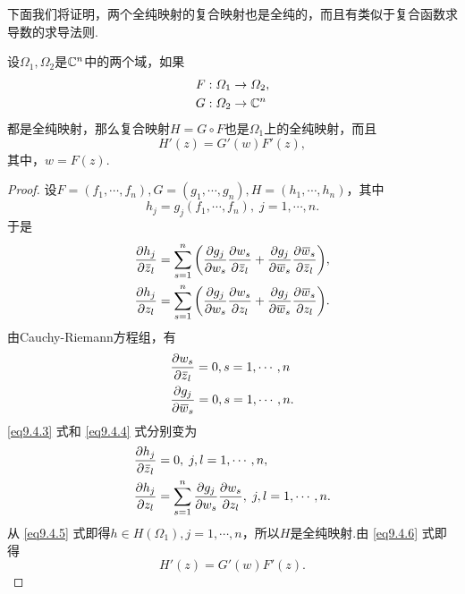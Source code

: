 下面我们将证明，两个全纯映射的复合映射也是全纯的，而且有类似于复合函数求导数的求导法则.
\begin{prop}\label{prop9.4.4}
设$\Omega_1,\Omega_2$是$\MC^n$中的两个域，如果
\begin{align*}
&F:\Omega_1\to\Omega_2,\\
&G:\Omega_2\to\MC^n
\end{align*}
都是全纯映射，那么复合映射$H=G\circ F$也是$\Omega_1$上的全纯映射，而且
\[H'(z)=G'(w)F'(z),\]
其中，$w=F(z)$.
\end{prop}
\begin{proof}
设$F=(f_1,\cdots,f_n),G=(g_1,\cdots,g_n),H=(h_1,\cdots,h_n)$，其中
\[h_j=g_j(f_1,\cdots,f_n),\;j=1,\cdots,n.\]
于是
\begin{align}
&\pp{h_j}{\bar{z}_l}=\sum_{s=1}^n\bigg(\pp{g_j}{w_s}\pp{w_s}{\bar{z}_l}
+\pp{g_j}{\bar{w}_s}\pp{\bar{w}_s}{\bar{z}_l}\bigg),\label{eq9.4.3}\\
&\pp{h_j}{z_l}=\sum_{s=1}^n\bigg(\pp{g_j}{w_s}\pp{w_s}{z_l}
+\pp{g_j}{\bar{w}_s}\pp{\bar{w}_s}{z_l}\bigg).\label{eq9.4.4}
\end{align}
由Cauchy-Riemann方程组，有
\begin{align*}
&\pp{w_s}{\bar{z}_l}=0,s=1,\cdots,n\\
&\pp{g_j}{\bar{w}_s}=0,s=1,\cdots,n.
\end{align*}
\eqref{eq9.4.3} 式和 \eqref{eq9.4.4} 式分别变为
\begin{align}
&\pp{h_j}{\bar{z}_l}=0,\;j,l=1,\cdots,n,\label{eq9.4.5}\\
&\pp{h_j}{z_l}=\sum_{s=1}^n\pp{g_j}{w_s}\pp{w_s}{z_l},\;j,l=1,\cdots,n.\label{eq9.4.6}
\end{align}
从 \eqref{eq9.4.5} 式即得$h\in H(\Omega_1),j=1,\cdots,n$，所以$H$是全纯映射.由 \eqref{eq9.4.6} 式即得
\begin{equation*}
  H'(z)=G'(w)F'(z).
\end{equation*}
\end{proof}

